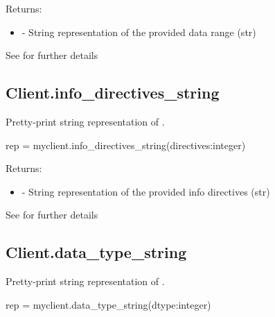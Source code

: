 Returns:
\begin{itemize}
    \item {} - String representation of the provided data range (str)
\end{itemize}

See  for further details


\subsection{Client.info_directives_string}

\summary

Pretty-print string representation of .

\format

\pyspecificstart
\begin{codepar}
rep = myclient.info_directives_string(directives:integer)
\end{codepar}
\pyspecificend

\begin{arglist}
\end{arglist}

Returns:
\begin{itemize}
    \item {} - String representation of the provided info directives (str)
\end{itemize}

See  for further details


\subsection{Client.data_type_string}

\summary

Pretty-print string representation of .

\format

\pyspecificstart
\begin{codepar}
rep = myclient.data_type_string(dtype:integer)
\end{codepar}
\pyspecificend

